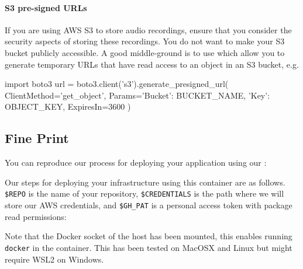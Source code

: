 \documentclass{csse4400}
\begin{document}

\paragraph{S3 pre-signed URLs}
If you are using AWS S3 to store audio recordings,
ensure that you consider the security aspects of storing these recordings.
You do not want to make your S3 bucket publicly accessible.
A good middle-ground is to use  which allow you to generate temporary URLs that have read access to an object in an S3 bucket, e.g.

\begin{code}[language=python]{}
import boto3
url = boto3.client('s3').generate_presigned_url(
  ClientMethod='get_object', 
  Params={'Bucket': BUCKET_NAME, 'Key': OBJECT_KEY},
  ExpiresIn=3600
)
\end{code}


\subsection{Fine Print}
You can reproduce our process for deploying your application using our :

\noindent
Our steps for deploying your infrastructure using this container are as follows.
\texttt{\$REPO} is the name of your repository,
\texttt{\$CREDENTIALS} is the path where we will store our AWS credentials,
and \texttt{\$GH\_PAT} is a personal access token with package read permissions:

\noindent
Note that the Docker socket of the host has been mounted,
this enables running \texttt{docker} in the container.
This has been tested on MacOSX and Linux but might require WSL2 on Windows.
\end{document}
